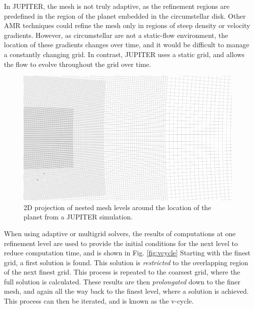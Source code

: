 \documentclass[preprint2]{aastex62}
\begin{document}
In JUPITER, the mesh is not truly adaptive, as the refinement regions are predefined in the region of the planet embedded in the circumstellar disk.
Other AMR techniques could refine the mesh only in regions of steep density or velocity gradients. 
However, as circumstellar are not a static-flow environment, the location of these gradients changes over time, and it would be difficult to manage a constantly changing grid. 
In contrast, JUPITER uses a static grid, and allows the flow to evolve throughout the grid over time.
\begin{figure}[t]
	\includegraphics[width=\linewidth]{figures/Presentation/meshface.png}
	\caption{\label{fig:mesh}2D projection of nested mesh levels around the location of the planet from a JUPITER simulation.}
\end{figure}

When using adaptive or multigrid solvers, the results of computations at one refinement level are used to provide the initial conditions for the next level to reduce computation time, and is shown in Fig. \ref{fig:vcycle} 
Starting with the finest grid, a first solution is found. 
This solution is \textit{restricted} to the overlapping region of the next finest grid. 
This process is repeated to the coarsest grid, where the full solution is calculated.
These results are then \textit{prolongated} down to the finer mesh, and again all the way back to the finest level, where a solution is achieved. 
This process can then be iterated, and is known as the v-cycle.
\end{document}
